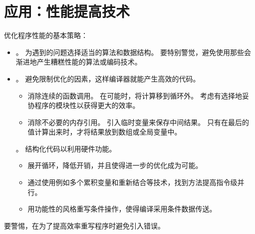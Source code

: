 
\section{应用：性能提高技术}
{
    优化程序性能的基本策略：

    \begin{itemize}
        \item
        {
            。
            为遇到的问题选择适当的算法和数据结构。
            要特别警觉，避免使用那些会渐进地产生糟糕性能的算法或编码技术。
        }
        \item
        {
            。
            避免限制优化的因素，这样编译器就能产生高效的代码。

            \begin{itemize}
                \item
                {
                    消除连续的函数调用。
                    在可能时，将计算移到循环外。
                    考虑有选择地妥协程序的模块性以获得更大的效率。
                }
                \item
                {
                    消除不必要的内存引用。
                    引入临时变量来保存中间结果。
                    只有在最后的值计算出来时，才将结果放到数组或全局变量中。
                }
            \end{itemize}
        }
        {
            。
            结构化代码以利用硬件功能。

            \begin{itemize}
                \item 展开循环，降低开销，并且使得进一步的优化成为可能。
                \item 通过使用例如多个累积变量和重新结合等技术，找到方法提高指令级并行。
                \item 用功能性的风格重写条件操作，使得编译采用条件数据传送。
            \end{itemize}
        }
    \end{itemize}

    要警惕，在为了提高效率重写程序时避免引入错误。
}
